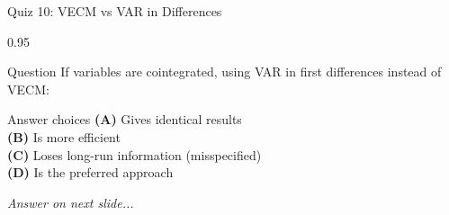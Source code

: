 \documentclass[9pt, aspectratio=169, t]{beamer}
\begin{document}
\begin{frame}{Quiz 10: VECM vs VAR in Differences}
    \begin{cminipage}{0.95\textwidth}
    \begin{alertblock}{Question}
        If variables are cointegrated, using VAR in first differences instead of VECM:
    \end{alertblock}

    \vspace{0.4cm}

    \begin{block}{Answer choices}
        \textcolor{MainBlue}{\textbf{(A)}} Gives identical results\\[3pt]
        \textcolor{MainBlue}{\textbf{(B)}} Is more efficient\\[3pt]
        \textcolor{MainBlue}{\textbf{(C)}} Loses long-run information (misspecified)\\[3pt]
        \textcolor{MainBlue}{\textbf{(D)}} Is the preferred approach
    \end{block}

    \vspace{0.5cm}

    \begin{center}
        \textit{Answer on next slide...}
    \end{center}
    \end{cminipage}
\end{frame}
\end{document}
